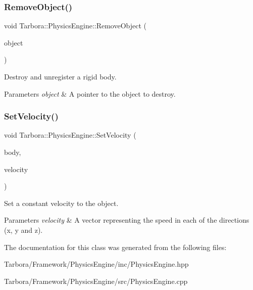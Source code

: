 \subsubsection{\texorpdfstring{Remove\+Object()}{RemoveObject()}}
{\footnotesize\ttfamily void Tarbora\+::\+Physics\+Engine\+::\+Remove\+Object (\begin{DoxyParamCaption}\item[{bt\+Collision\+Object $\ast$}]{object }\end{DoxyParamCaption})\hspace{0.3cm}{\ttfamily [static]}}



Destroy and unregister a rigid body. 


\begin{DoxyParams}{Parameters}
{\em object} & A pointer to the object to destroy. \\
\hline
\end{DoxyParams}
\mbox{\label{classTarbora_1_1PhysicsEngine_a1c4650ee51cd6094b6faa141206a6403}} 
\subsubsection{\texorpdfstring{Set\+Velocity()}{SetVelocity()}}
{\footnotesize\ttfamily void Tarbora\+::\+Physics\+Engine\+::\+Set\+Velocity (\begin{DoxyParamCaption}\item[{bt\+Rigid\+Body $\ast$}]{body,  }\item[{const glm\+::vec3 \&}]{velocity }\end{DoxyParamCaption})\hspace{0.3cm}{\ttfamily [static]}}



Set a constant velocity to the object. 


\begin{DoxyParams}{Parameters}
{\em velocity} & A vector representing the speed in each of the directions (x, y and z). \\
\hline
\end{DoxyParams}


The documentation for this class was generated from the following files\+:\begin{DoxyCompactItemize}
\item 
Tarbora/\+Framework/\+Physics\+Engine/inc/Physics\+Engine.\+hpp\item 
Tarbora/\+Framework/\+Physics\+Engine/src/Physics\+Engine.\+cpp\end{DoxyCompactItemize}
